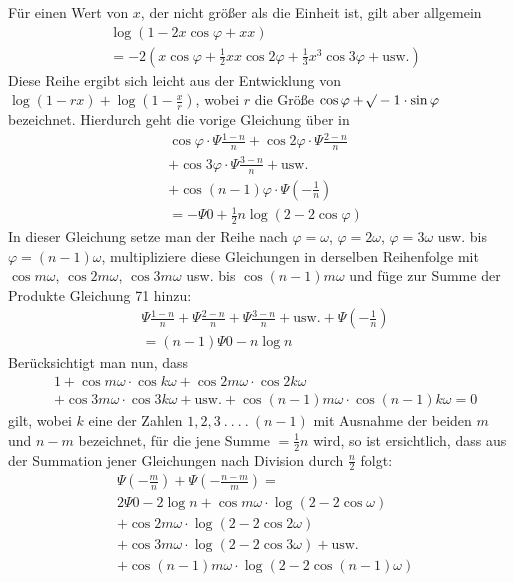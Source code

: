 Für einen Wert von $x$, der nicht größer als die Einheit ist, gilt aber allgemein
\[
\begin{aligned}
&\log(1-2x\cos\varphi+xx)\\[4pt]
&=-2(x\cos\varphi+\tfrac12xx\cos2\varphi+\tfrac13x^3\cos3\varphi+\text{usw.})
\end{aligned}
\]
Diese Reihe ergibt sich leicht aus der Entwicklung von $\log(1-rx)+\log\left(1-\frac xr\right)$, wobei $r$ die Größe $\cos\varphi+\mathord{{}^{}\!\surd}-1\cdot\sin\varphi$ bezeichnet. Hierdurch geht die vorige Gleichung über in
\[
\begin{aligned}
&\cos\varphi\cdot\Psi\frac{1-n}{n}+\cos2\varphi\cdot\Psi\frac{2-n}{n}\\[4pt]
&+\cos3\varphi\cdot\Psi\frac{3-n}{n}+\text{usw.}\\[4pt]
&+\cos(n-1)\varphi\cdot\Psi\left(-\frac1n\right)
\\[4pt]
&=-\Psi0+\tfrac12n\log(2-2\cos\varphi)
\end{aligned}
\tag*{[72]}\]
In dieser Gleichung setze man der Reihe nach $\varphi=\omega$, $\varphi=2\omega$, $\varphi=3\omega$ usw. bis $\varphi=(n-1)\omega$, multipliziere diese Gleichungen in derselben Reihenfolge mit $\cos m\omega$, $\cos2m\omega$, $\cos3m\omega$ usw. bis $\cos(n-1)m\omega$ und füge zur Summe der Produkte Gleichung 71 hinzu:
\[
\begin{aligned}
&\Psi\frac{1-n}{n}+\Psi\frac{2-n}{n}+\Psi\frac{3-n}{n}+\text{usw.}+\Psi\left(-\frac1n\right)\\[4pt]
&=(n-1)\Psi0-n\log n
\end{aligned}
\]
Berücksichtigt man nun, dass
\[
\begin{aligned}
&1+\cos m\omega\cdot\cos k\omega+\cos2m\omega\cdot\cos2k\omega\\[4pt]
&+\cos3m\omega\cdot\cos3k\omega
+\text{usw.}+\cos(n-1)m\omega\cdot\cos(n-1)k\omega=0
\end{aligned}
\]
gilt, wobei $k$ eine der Zahlen $1,2,3\ .\ .\ .\ .\ (n-1)$ mit Ausnahme der beiden $m$ und $n-m$ bezeichnet, für die jene Summe $=\tfrac12n$ wird, so ist ersichtlich, dass aus der Summation jener Gleichungen nach Division durch $\frac n2$ folgt:
\[
\begin{aligned}
&\Psi\left(-\frac mn\right)+\Psi\left(-\frac{n-m}{m}\right)=
\\[4pt]
&2\Psi0-2\log n+\cos m\omega\cdot\log(2-2\cos\omega)\\[4pt]
&+\cos2m\omega\cdot\log(2-2\cos2\omega)
\\[4pt]
&+\cos3m\omega\cdot\log(2-2\cos3\omega)+\text{usw.}\\[4pt]
&+\cos(n-1)m\omega\cdot\log(2-2\cos(n-1)\omega)
\end{aligned}
\tag*{[73]}\]
